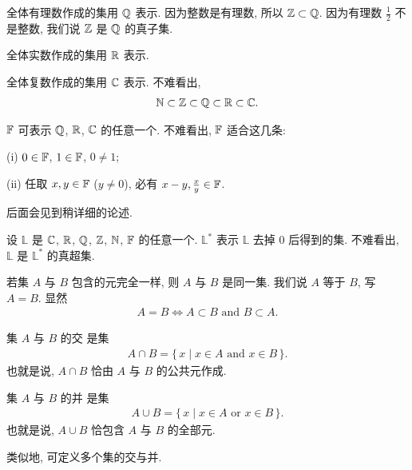 \begin{example}
    全体有理数作成的集用 $\mathbb{Q}$  表示. 因为整数是有理数, 所以 $\mathbb{Z} \subset \mathbb{Q}$. 因为有理数 $\frac12$ 不是整数, 我们说 $\mathbb{Z}$ 是 $\mathbb{Q}$ 的真子集.
\end{example}

\begin{definition}
    全体实数作成的集用 $\mathbb{R}$  表示.
\end{definition}

\begin{definition}
    全体复数作成的集用 $\mathbb{C}$  表示. 不难看出,
    \begin{align*}
        \mathbb{N} \subset \mathbb{Z} \subset \mathbb{Q} \subset \mathbb{R} \subset \mathbb{C}.
    \end{align*}
\end{definition}

\begin{definition}
    $\mathbb{F}$  可表示 $\mathbb{Q}$, $\mathbb{R}$, $\mathbb{C}$ 的任意一个. 不难看出, $\mathbb{F}$ 适合这几条:

    (i) $0 \in \mathbb{F}$, $1 \in \mathbb{F}$, $0 \neq 1$;

    (ii) 任取 $x,y \in \mathbb{F}$ ($y \neq 0$), 必有 $x-y, \frac{x}{y} \in \mathbb{F}$.

    后面会见到稍详细的论述.
\end{definition}

\begin{definition}
    设 $\mathbb{L}$ 是 $\mathbb{C}$, $\mathbb{R}$, $\mathbb{Q}$, $\mathbb{Z}$, $\mathbb{N}$, $\mathbb{F}$ 的任意一个. $\mathbb{L}^{\ast}$ 表示 $\mathbb{L}$ 去掉 $0$ 后得到的集. 不难看出, $\mathbb{L}$ 是 $\mathbb{L}^{\ast}$ 的真超集.
\end{definition}

\begin{definition}
    若集 $A$ 与 $B$ 包含的元完全一样, 则 $A$ 与 $B$ 是同一集. 我们说 $A$ 等于 $B$, 写 $A = B$. 显然
    \begin{align*}
        A = B \iff A \subset B \text{ and } B \subset A.
    \end{align*}
\end{definition}

\begin{definition}
    集 $A$ 与 $B$ 的交  是集
    \begin{align*}
        A \cap B = \{\, x \mid x \in A \text{ and } x \in B \,\}.
    \end{align*}
    也就是说, $A \cap B$ 恰由 $A$ 与 $B$ 的公共元作成.

    集 $A$ 与 $B$ 的并  是集
    \begin{align*}
        A \cup B = \{\, x \mid x \in A \text{ or } x \in B \,\}.
    \end{align*}
    也就是说, $A \cup B$ 恰包含 $A$ 与 $B$ 的全部元.

    类似地, 可定义多个集的交与并.
\end{definition}

